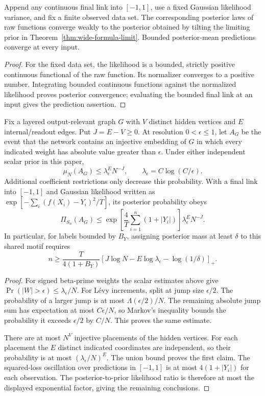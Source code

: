 \begin{corollary}
Append any continuous final link into $[-1,1]$, use a fixed Gaussian likelihood variance, and fix a finite observed data set. The corresponding posterior laws of raw functions converge weakly to the posterior obtained by tilting the limiting prior in Theorem~\ref{thm:wide-formula-limit}. Bounded posterior-mean predictions converge at every input.
\end{corollary}
\begin{proof}
For the fixed data set, the likelihood is a bounded, strictly positive continuous functional of the raw function. Its normalizer converges to a positive number. Integrating bounded continuous functions against the normalized likelihood proves posterior convergence; evaluating the bounded final link at an input gives the prediction assertion.
\end{proof}

\begin{proposition}
\label{prop:shared-motif}
Fix a layered output-relevant graph $G$ with $V$ distinct hidden vertices and $E$ internal/readout edges. Put $J=E-V\ge0$. At resolution $0<\epsilon\le1$, let $A_G$ be the event that the network contains an injective embedding of $G$ in which every indicated weight has absolute value greater than $\epsilon$. Under either independent scalar prior in this paper,
\[
 \mu_N(A_G)\le\lambda_\epsilon^E N^{-J},
 \qquad\lambda_\epsilon=C\log(C/\epsilon).
\]
Additional coefficient restrictions only decrease this probability. With a final link into $[-1,1]$ and Gaussian likelihood written as $\exp[-\sum_i(f(X_i)-Y_i)^2/T]$, its posterior probability obeys
\[
 \Pi_{S_n}(A_G)
 \le \exp\left[\frac4T\sum_{i=1}^n(1+|Y_i|)\right]
             \lambda_\epsilon^E N^{-J}.
\]
In particular, for labels bounded by $B_Y$, assigning posterior mass at least $\delta$ to this shared motif requires
\[
 n\ge\frac{T}{4(1+B_Y)}
   \left[J\log N-E\log\lambda_\epsilon-\log(1/\delta)\right]_+.
\]
\end{proposition}
\begin{proof}
For signed beta-prime weights the scalar estimates above give
$\Pr(|W|>\epsilon)\le\lambda_\epsilon/N$. For L\'evy increments, split at jump size $\epsilon/2$. The probability of a larger jump is at most $\Lambda(\epsilon/2)/N$. The remaining absolute jump sum has expectation at most $C\epsilon/N$, so Markov's inequality bounds the probability it exceeds $\epsilon/2$ by $C/N$. This proves the same estimate.

There are at most $N^V$ injective placements of the hidden vertices. For each placement the $E$ distinct indicated coordinates are independent, so their probability is at most $(\lambda_\epsilon/N)^E$. The union bound proves the first claim. The squared-loss oscillation over predictions in $[-1,1]$ is at most $4(1+|Y_i|)$ for each observation. The posterior-to-prior likelihood ratio is therefore at most the displayed exponential factor, giving the remaining conclusions.
\end{proof}


